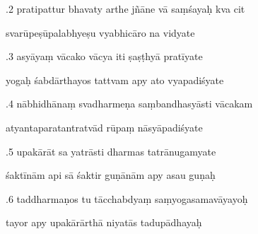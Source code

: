 \documentclass[article,12pt,a4paper]{memoir}%
\newcounter{parCount}
\begin{document}
	  
	  \pstart {}.2 pratipattur bhavaty arthe jñāne vā saṃśayaḥ kva cit 
	{}
	\pend%
      

	  
	  \pstart \leavevmode%
	svarūpeṣūpalabhyeṣu vyabhicāro na vidyate 
	{}
	\pend%
      

	  
	  \pstart {}.3 asyāyaṃ vācako vācya iti ṣaṣṭhyā pratīyate 
	{}
	\pend%
      

	  
	  \pstart \leavevmode%
	yogaḥ śabdārthayos tattvam apy ato vyapadiśyate 
	{}
	\pend%
      

	  
	  \pstart {}.4 nābhidhānaṃ svadharmeṇa saṃbandhasyāsti vācakam 
	{}
	\pend%
      

	  
	  \pstart \leavevmode%
	atyantaparatantratvād rūpaṃ nāsyāpadiśyate 
	{}
	\pend%
      

	  
	  \pstart {}.5 upakārāt sa yatrāsti dharmas tatrānugamyate 
	{}
	\pend%
      

	  
	  \pstart \leavevmode%
	śaktīnām api sā śaktir guṇānām apy asau guṇaḥ 
	{}
	\pend%
      

	  
	  \pstart {}.6 taddharmaṇos tu tācchabdyaṃ   saṃyogasamavāyayoḥ 
	{}
	\pend%
      

	  
	  \pstart \leavevmode%
	tayor apy upakārārthā niyatās tadupādhayaḥ 
	{}
	\pend%
      
\end{document}
